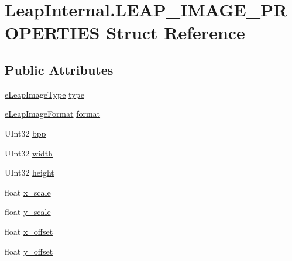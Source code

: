 \hypertarget{struct_leap_internal_1_1_l_e_a_p___i_m_a_g_e___p_r_o_p_e_r_t_i_e_s}{}\section{Leap\+Internal.\+L\+E\+A\+P\+\_\+\+I\+M\+A\+G\+E\+\_\+\+P\+R\+O\+P\+E\+R\+T\+I\+ES Struct Reference}
\label{struct_leap_internal_1_1_l_e_a_p___i_m_a_g_e___p_r_o_p_e_r_t_i_e_s}
\subsection*{Public Attributes}
\begin{DoxyCompactItemize}
\item 
\mbox{\hyperlink{namespace_leap_internal_aa8c735677264cfdbefdd598adb92a1f5}{e\+Leap\+Image\+Type}} \mbox{\hyperlink{struct_leap_internal_1_1_l_e_a_p___i_m_a_g_e___p_r_o_p_e_r_t_i_e_s_ac5d4fd02a2dc7d7295eaf280bba72bb4}{type}}
\item 
\mbox{\hyperlink{namespace_leap_internal_aca2c532ae62549187d1f6e33ee818035}{e\+Leap\+Image\+Format}} \mbox{\hyperlink{struct_leap_internal_1_1_l_e_a_p___i_m_a_g_e___p_r_o_p_e_r_t_i_e_s_aabced9f323003df5e2bfdf9bf3fe82fe}{format}}
\item 
U\+Int32 \mbox{\hyperlink{struct_leap_internal_1_1_l_e_a_p___i_m_a_g_e___p_r_o_p_e_r_t_i_e_s_a3d7d6cbac068de89f9346ef8f0013a44}{bpp}}
\item 
U\+Int32 \mbox{\hyperlink{struct_leap_internal_1_1_l_e_a_p___i_m_a_g_e___p_r_o_p_e_r_t_i_e_s_a1eec918bb984b3ac6fe010dc63ed6600}{width}}
\item 
U\+Int32 \mbox{\hyperlink{struct_leap_internal_1_1_l_e_a_p___i_m_a_g_e___p_r_o_p_e_r_t_i_e_s_af8c46dbe4f22b6302e1268791802c6d5}{height}}
\item 
float \mbox{\hyperlink{struct_leap_internal_1_1_l_e_a_p___i_m_a_g_e___p_r_o_p_e_r_t_i_e_s_a46f83007edccb86776bcc78f2c4b7872}{x\+\_\+scale}}
\item 
float \mbox{\hyperlink{struct_leap_internal_1_1_l_e_a_p___i_m_a_g_e___p_r_o_p_e_r_t_i_e_s_a6d2cc73015b436a099a4162a7855222c}{y\+\_\+scale}}
\item 
float \mbox{\hyperlink{struct_leap_internal_1_1_l_e_a_p___i_m_a_g_e___p_r_o_p_e_r_t_i_e_s_a593bbcc11a57abddf397a343bfc3753c}{x\+\_\+offset}}
\item 
float \mbox{\hyperlink{struct_leap_internal_1_1_l_e_a_p___i_m_a_g_e___p_r_o_p_e_r_t_i_e_s_a78a00f78f0927a5ed940ed3c75f87c90}{y\+\_\+offset}}
\end{DoxyCompactItemize}


